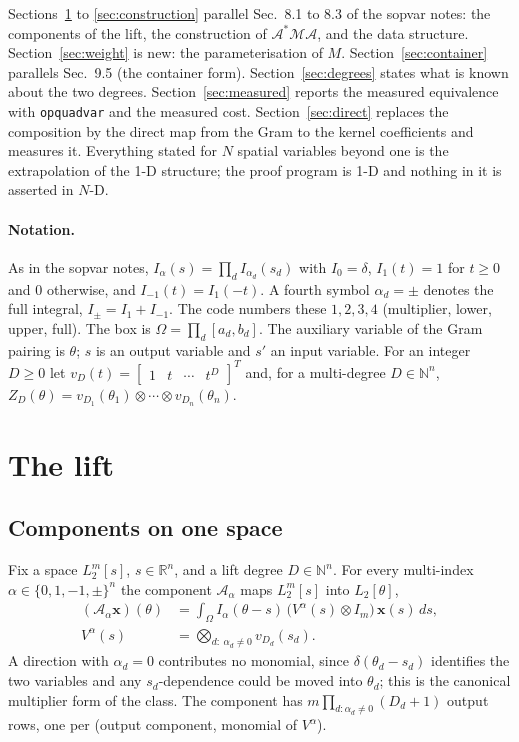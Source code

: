 \documentclass[12pt]{article}
\newcommand{\R}{\mathbb{R}}
\newcommand{\N}{\mathbb{N}}
\newcommand{\mcl}[1]{\mathcal{#1}}
\newcommand{\mbf}[1]{\mathbf{#1}}
\newcommand{\bmat}[1]{\begin{bmatrix} #1 \end{bmatrix}}
\newcommand{\code}[1]{\texttt{#1}}
\theoremstyle{plain}
\theoremstyle{definition}
\theoremstyle{remark}
\begin{document}
Sections~\ref{sec:lift} to \ref{sec:construction} parallel Sec.~8.1 to 8.3 of the sopvar notes: the components of the lift, the construction of $\mcl A^*\mcl M\mcl A$, and the data structure. Section~\ref{sec:weight} is new: the parameterisation of $M$. Section~\ref{sec:container} parallels Sec.~9.5 (the container form). Section~\ref{sec:degrees} states what is known about the two degrees. Section~\ref{sec:measured} reports the measured equivalence with \code{opquadvar} and the measured cost. Section~\ref{sec:direct} replaces the composition by the direct map from the Gram to the kernel coefficients and measures it. Everything stated for $N$ spatial variables beyond one is the extrapolation of the 1-D structure; the proof program is 1-D and nothing in it is asserted in $N$-D.

\paragraph{Notation.} As in the sopvar notes, $I_{\alpha}(s)=\prod_d I_{\alpha_d}(s_d)$ with $I_0=\delta$, $I_1(t)=1$ for $t\ge 0$ and $0$ otherwise, and $I_{-1}(t)=I_1(-t)$. A fourth symbol $\alpha_d=\pm$ denotes the full integral, $I_{\pm}=I_1+I_{-1}$. The code numbers these $1,2,3,4$ (multiplier, lower, upper, full). The box is $\Omega=\prod_d[a_d,b_d]$. The auxiliary variable of the Gram pairing is $\theta$; $s$ is an output variable and $s'$ an input variable. For an integer $D\ge 0$ let $v_D(t)=\bmat{1&t&\cdots&t^D}^T$ and, for a multi-degree $D\in\N^n$, $Z_D(\theta)=v_{D_1}(\theta_1)\otimes\cdots\otimes v_{D_n}(\theta_n)$.

\section{The lift}\label{sec:lift}

\subsection{Components on one space}

Fix a space $L_2^m[s]$, $s\in\R^{n}$, and a lift degree $D\in\N^{n}$. For every multi-index $\alpha\in\{0,1,-1,\pm\}^{n}$ the component $\mcl A_\alpha$ maps $L_2^m[s]$ into $L_2[\theta]$,
\begin{equation}\label{eq:component}
\begin{aligned}
(\mcl A_\alpha\mbf x)(\theta)&=\int_\Omega I_\alpha(\theta-s)\,\bigl(V^\alpha(s)\otimes I_m\bigr)\,\mbf x(s)\,ds,\\
V^\alpha(s)&=\bigotimes_{d:\ \alpha_d\ne 0}v_{D_d}(s_d).
\end{aligned}
\end{equation}
A direction with $\alpha_d=0$ contributes no monomial, since $\delta(\theta_d-s_d)$ identifies the two variables and any $s_d$-dependence could be moved into $\theta_d$; this is the canonical multiplier form of the class. The component has $m\prod_{d:\alpha_d\ne0}(D_d+1)$ output rows, one per (output component, monomial of $V^\alpha$).
\end{document}
